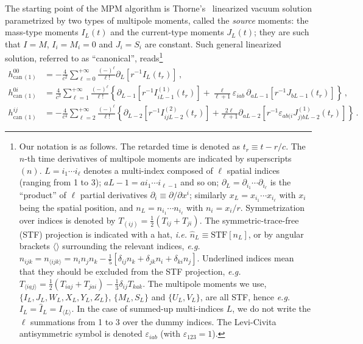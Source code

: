 \documentclass[prd,preprint,superscriptaddress,tightenlines,nofootinbib,
  eqsecnum,showpacs]{revtex4}
\begin{document}
The starting point of the MPM algorithm is Thorne's~\cite{Th80}
linearized vacuum solution parametrized by two types of multipole
moments, called the \textit{source} moments: the mass-type moments
$I_L(t)$ and the current-type moments $J_L(t)$; they are such that
$I=M$, $I_i=M_i=0$ and $J_i=S_i$ are constant. Such  general linearized
solution, referred to as ``canonical'', reads\footnote{Our notation is
  as follows. The retarded time is denoted as $t_r\equiv t-r/c$. The
  $n$-th time derivatives of multipole moments are indicated by
  superscripts $(n)$. $L = i_1 \cdots i_\ell$ denotes a multi-index
  composed of $\ell$ spatial indices (ranging from 1 to 3); $aL-1=a
  i_1 \cdots i_{\ell-1}$ and so on; $\partial_L = \partial_{i_1}
  \cdots \partial_{i_\ell}$ is the ``product'' of $\ell$ partial
  derivatives $\partial_i \equiv \partial / \partial x^i$; similarly
  $x_L = x_{i_1} \cdots x_{i_\ell}$ with $x_i$ being the spatial
  position, and $n_L = n_{i_1} \cdots n_{i_\ell}$ with
  $n_i=x_i/r$. Symmetrization over indices is denoted by
  $T_{(ij)}=\frac{1}{2}(T_{ij}+T_{ji})$. The symmetric-trace-free
  (STF) projection is indicated with a hat, \textit{i.e.} $\hat{n}_L
  \equiv \text{STF}[n_L]$, or by angular brackets $\langle\rangle$
  surrounding the relevant indices, \textit{e.g.}
  $\hat{n}_{ijk}=n_{\langle
    ijk\rangle}=n_in_jn_k-\frac{1}{5}[\delta_{ij}n_k +\delta_{jk}n_i
    +\delta_{ki}n_j]$. Underlined indices mean that they should be
  excluded from the STF projection, \textit{e.g.} $T_{\langle
    i\underline{a}j\rangle}=\frac{1}{2}(T_{iaj}+T_{jai}) -
  \frac{1}{3}\delta_{ij}T_{kak}$. The multipole moments we use,
  $\{I_L, J_L, W_L, X_L, Y_L, Z_L\}$, $\{M_L, S_L\}$ and $\{U_L,
  V_L\}$, are all STF, hence \textit{e.g.} $I_L=\hat{I}_L=I_{\langle
    L\rangle}$. In the case of summed-up multi-indices $L$, we do not
  write the $\ell$ summations from 1 to 3 over the dummy indices. The
  Levi-Civita antisymmetric symbol is denoted $\varepsilon_{iab}$
  (with $\varepsilon_{123}=1$).}
%
\begin{subequations} \label{hcan1}
\begin{align}
h^{00}_{\mathrm{can}\,(1)} &= -\frac{4}{c^2}\sum_{\ell = 0}^{+\infty}
\frac{(-)^\ell}{\ell !} \partial_L \left[ r^{-1} I_L (t_r)\right] \,
,\\ h^{0i}_{\mathrm{can}\,(1)} &= \frac{4}{c^3}\sum_{\ell =
  1}^{+\infty} \frac{(-)^\ell}{\ell!}  \left\{ \partial_{L-1} \left[
  r^{-1} I_{iL-1}^{(1)} (t_r)\right] + \frac{\ell}{\ell+1}
\varepsilon_{iab} \, \partial_{aL-1} \left[ r^{-1} J_{bL-1}
  (t_r)\right]\right\} \, ,\\ h^{ij}_{\mathrm{can}\,(1)} &=
-\frac{4}{c^4} \sum_{\ell = 2}^{+\infty} \frac{(-)^\ell}{\ell !}
\left\{ \partial_{L-2} \left[ r^{-1} I_{ijL-2}^{(2)} (t_r)\right] +
\frac{2\ell}{\ell+1} \partial_{aL-2} \left[ r^{-1} \varepsilon_{ab(i}
  J_{j)bL-2}^{(1)} (t_r)\right]\right\}\,.
\end{align}
\end{subequations}
\end{document}
